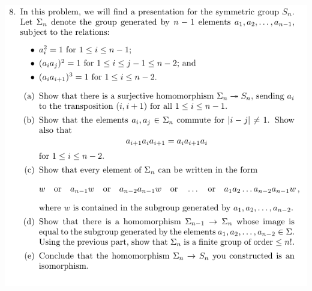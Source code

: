 \documentclass[12pt,letterpaper,boxed]{hmcpset}
\begin{document}
\newpage


\begin{problem}
	\includegraphics[scale=0.8]{8.png}
	\hfill
\end{problem}
\end{document}
